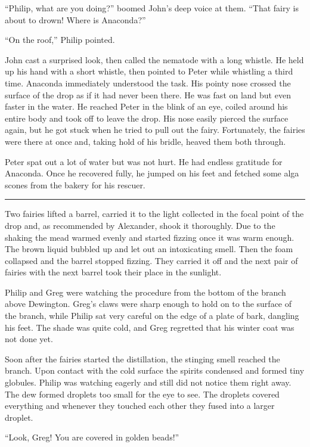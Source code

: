 \documentclass[10pt]{memoir}
\renewcommand{\pfbreakdisplay}{\bigskip \ding{166} \bigskip}
\newcommand{\secbreak}{\fancybreak{\pfbreakdisplay}}
\begin{document}
``Philip, what are you doing?'' boomed John's deep voice at them. ``That fairy
is about to drown! Where is Anaconda?''

``On the roof,'' Philip pointed.

John cast a surprised look, then called the nematode with a long whistle. He
held up his hand with a short whistle, then pointed to Peter while whistling a
third time. Anaconda immediately understood the task. His pointy nose crossed
the surface of the drop as if it had never been there. He was fast on land but
even faster in the water. He reached Peter in the blink of an eye, coiled
around his entire body and took off to leave the drop. His nose easily pierced
the surface again, but he got stuck when he tried to pull out the fairy.
Fortunately, the fairies were there at once and, taking hold of his bridle,
heaved them both through.

Peter spat out a lot of water but was not hurt. He had endless gratitude for
Anaconda. Once he recovered fully, he jumped on his feet and fetched some alga
scones from the bakery for his rescuer.

\secbreak

Two fairies lifted a barrel, carried it to the light collected in the focal
point of the drop and, as recommended by Alexander, shook it thoroughly. Due to
the shaking the mead warmed evenly and started fizzing once it was warm enough.
The brown liquid bubbled up and let out an intoxicating smell. Then the foam
collapsed and the barrel stopped fizzing. They carried it off and the next pair
of fairies with the next barrel took their place in the sunlight.

Philip and Greg were watching the procedure from the bottom of the branch above
Dewington. Greg's claws were sharp enough to hold on to the surface of the
branch, while Philip sat very careful on the edge of a plate of bark, dangling
his feet. The shade was quite cold, and Greg regretted that his winter coat was
not done yet.

Soon after the fairies started the distillation, the stinging smell reached the
branch. Upon contact with the cold surface the spirits condensed and formed
tiny globules. Philip was watching eagerly and still did not notice them right
away. The dew formed droplets too small for the eye to see. The droplets
covered everything and whenever they touched each other they fused into a
larger droplet.

``Look, Greg! You are covered in golden beads!''
\end{document}
